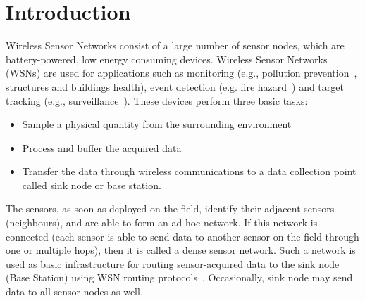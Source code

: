 \chapter{Introduction}

Wireless Sensor Networks consist of a large number of sensor nodes, which are battery-powered, low energy consuming devices. Wireless Sensor Networks (WSNs) are used for applications such as monitoring (e.g., pollution prevention~\cite{application2}, structures and buildings health), event detection (e.g. fire hazard~\cite{firehazard}) and target tracking (e.g., surveillance~\cite{application3}). These devices perform three basic tasks:
\begin{itemize}
\item Sample a physical quantity from the surrounding environment
\item Process and buffer the acquired data
\item Transfer the data through wireless communications to a data collection point called sink node or base station.
\end{itemize}
The sensors, as soon as deployed on the field, identify their adjacent 
sensors (neighbours), and are able to form an ad-hoc network. If this network is connected (each sensor is able to send data to another sensor on the field through one or multiple hops), then it is called a dense sensor 
network. Such a network is used as basic infrastructure for routing 
sensor-acquired data to the sink node (Base Station) 
using WSN routing protocols~\cite{routingSurvey}. Occasionally, sink node
may send data to all sensor nodes as well. 

